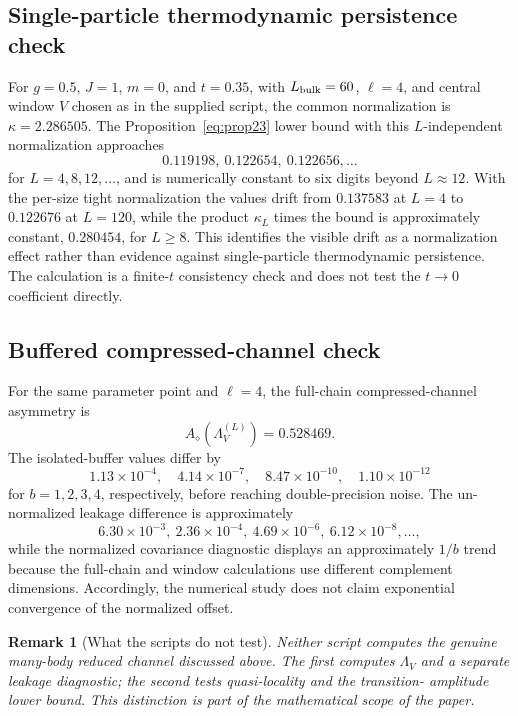 \documentclass[reprint,amsmath,amssymb,aps,nofootinbib]{revtex4-2}
\newtheorem{remark}{Remark}
\begin{document}
\subsection{Single-particle thermodynamic persistence check}
For $g=0.5$, $J=1$, $m=0$, and $t=0.35$, with $L_{\rm bulk}=60$, $\ell=4$, and central
window $V$ chosen as in the supplied script, the common normalization is
$\kappa=2.286505$. The Proposition~\ref{eq:prop23} lower bound with this $L$-independent normalization approaches
\begin{equation}
0.119198,\ 0.122654,\ 0.122656,\ldots
\end{equation}
for $L=4,8,12,\ldots$, and is numerically constant to six digits beyond $L\approx12$.
With the per-size tight normalization the values drift from $0.137583$ at $L=4$ to
$0.122676$ at $L=120$, while the product $\kappa_L$ times the bound is approximately constant,
$0.280454$, for $L\ge8$. This identifies the visible drift as a normalization effect rather than
evidence against single-particle thermodynamic persistence. The calculation is a finite-$t$ consistency check and
does not test the $t\to0$ coefficient directly.

\subsection{Buffered compressed-channel check}
For the same parameter point and $\ell=4$, the full-chain compressed-channel asymmetry is
\begin{equation}
A_\diamond(\Lambda_V^{(L)})=0.528469.
\end{equation}
The isolated-buffer values differ by
\begin{equation}
1.13\times10^{-4},\quad
4.14\times10^{-7},\quad
8.47\times10^{-10},\quad
1.10\times10^{-12}
\end{equation}
for $b=1,2,3,4$, respectively, before reaching double-precision noise. The un-normalized leakage
difference is approximately
\begin{equation}
6.30\times10^{-3},\ 2.36\times10^{-4},\ 4.69\times10^{-6},\ 6.12\times10^{-8},\ldots,
\end{equation}
while the normalized covariance diagnostic displays an approximately $1/b$ trend because the
full-chain and window calculations use different complement dimensions. Accordingly, the numerical
study does not claim exponential convergence of the normalized offset.

\begin{remark}[What the scripts do not test]
Neither script computes the genuine many-body reduced channel discussed above. The first computes
$\Lambda_V$ and a separate leakage diagnostic; the second tests quasi-locality and the transition-
amplitude lower bound. This distinction is part of the mathematical scope of the paper.
\end{remark}
\end{document}
